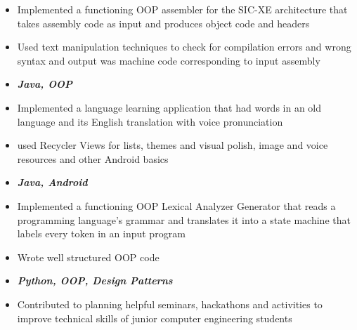 \documentclass[10pt,a4paper]{altacv}
\begin{document}
\begin{itemize}
\item Implemented a functioning OOP assembler for the SIC-XE architecture that takes assembly code as input and produces object code and headers
\item Used text manipulation techniques to check for compilation errors and wrong syntax  and output was machine code corresponding to input assembly
\item \textit{\textbf{Java, OOP}}
\end{itemize}
\divider
{}
\begin{itemize}
\item Implemented a language learning application that had words in an old language and its English translation with voice pronunciation
\item used Recycler Views for lists, themes and visual polish, image and voice resources and other Android basics
\item \textit{\textbf{Java, Android}}
\end{itemize}

\begin{itemize}
\item Implemented a functioning OOP Lexical Analyzer Generator that reads a programming language's grammar and translates it into a state machine that labels every token in an input program
\item Wrote well structured OOP code
\item \textit{\textbf{Python, OOP, Design Patterns}}
\end{itemize}
\divider

\begin{itemize}
\item Contributed to planning helpful seminars, hackathons and activities to improve technical skills of junior computer engineering students
\end{itemize}

\divider

\end{document}

